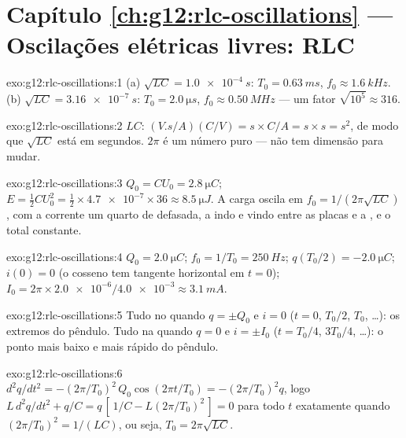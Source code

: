 \section*{Capítulo \ref{ch:g12:rlc-oscillations} --- Oscilações elétricas livres: RLC}

\begin{solution}{exo:g12:rlc-oscillations:1}
(a) $\sqrt{LC} = \qty{1.0e-4}{s}$: $T_0 = \qty{0.63}{ms}$,
$f_0 \approx \qty{1.6}{kHz}$. (b) $\sqrt{LC} = \qty{3.16e-7}{s}$:
$T_0 = \qty{2.0}{\micro s}$, $f_0 \approx \qty{0.50}{MHz}$ --- um fator
$\sqrt{10^5} \approx 316$.
\end{solution}

\begin{solution}{exo:g12:rlc-oscillations:2}
$LC$: $(\unit{V.s/A})(\unit{C/V}) = \unit{s} \times \unit{C/A} =
\unit{s} \times \unit{s} = \unit{s^2}$, de modo que $\sqrt{LC}$ está em
segundos. $2\pi$ é um número puro --- não tem dimensão para mudar.
\end{solution}

\begin{solution}{exo:g12:rlc-oscillations:3}
$Q_0 = CU_0 = \qty{2.8}{\micro C}$;
$E = \tfrac12 CU_0^2 = \tfrac12 \times \num{4.7e-7} \times 36 \approx
\qty{8.5}{\micro J}$. A carga oscila em $f_0 = 1/(2\pi\sqrt{LC})$, com a
corrente um quarto de  defasada, a  indo e vindo entre as
placas e a , e o total constante.
\end{solution}

\begin{solution}{exo:g12:rlc-oscillations:4}
$Q_0 = \qty{2.0}{\micro C}$; $f_0 = 1/T_0 = \qty{250}{Hz}$;
$q(T_0/2) = \qty{-2.0}{\micro C}$; $i(0) = 0$ (o cosseno tem tangente
horizontal em $t=0$);
$I_0 = 2\pi \times \num{2.0e-6}/\num{4.0e-3} \approx \qty{3.1}{mA}$.
\end{solution}

\begin{solution}{exo:g12:rlc-oscillations:5}
Tudo no  quando $q = \pm Q_0$ e $i = 0$ ($t = 0$, $T_0/2$,
$T_0$, \dots): os extremos do pêndulo. Tudo na  quando $q = 0$ e
$i = \pm I_0$ ($t = T_0/4$, $3T_0/4$, \dots): o ponto mais baixo e mais
rápido do pêndulo.
\end{solution}

\begin{solution}{exo:g12:rlc-oscillations:6}
$d^2q/dt^2 = -(2\pi/T_0)^2\,Q_0\cos(2\pi t/T_0) = -(2\pi/T_0)^2 q$, logo
$L\,d^2q/dt^2 + q/C = q\,[\,1/C - L(2\pi/T_0)^2\,] = 0$ para todo $t$
exatamente quando $(2\pi/T_0)^2 = 1/(LC)$, ou seja,
$T_0 = 2\pi\sqrt{LC}$.
\end{solution}

